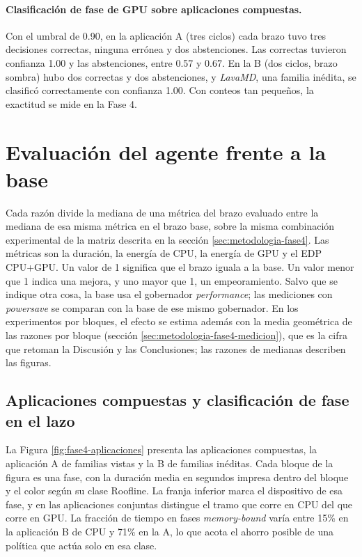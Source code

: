 \paragraph{Clasificación de fase de GPU sobre aplicaciones compuestas.}\label{sec:resultados-agente-deteccion} Con el umbral de 0.90, en la aplicación A (tres ciclos) cada brazo tuvo tres decisiones correctas, ninguna errónea y dos abstenciones. Las correctas tuvieron confianza 1.00 y las abstenciones, entre 0.57 y 0.67. En la B (dos ciclos, brazo sombra) hubo dos correctas y dos abstenciones, y \textit{LavaMD}, una familia inédita, se clasificó correctamente con confianza 1.00. Con conteos tan pequeños, la exactitud se mide en la Fase 4.



\section{Evaluación del agente frente a la base}
\label{sec:resultados-fase4}

Cada razón divide la mediana de una métrica del brazo evaluado entre la mediana de esa misma métrica en el brazo base, sobre la misma combinación experimental de la matriz descrita en la sección \ref{sec:metodologia-fase4}. Las métricas son la duración, la energía de CPU, la energía de GPU y el EDP CPU+GPU. Un valor de 1 significa que el brazo iguala a la base. Un valor menor que 1 indica una mejora, y uno mayor que 1, un empeoramiento. Salvo que se indique otra cosa, la base usa el gobernador \textit{performance}; las mediciones con \textit{powersave} se comparan con la base de ese mismo gobernador. En los experimentos por bloques, el efecto se estima además con la media geométrica de las razones por bloque (sección \ref{sec:metodologia-fase4-medicion}), que es la cifra que retoman la Discusión y las Conclusiones; las razones de medianas describen las figuras.

\subsection{Aplicaciones compuestas y clasificación de fase en el lazo}
\label{sec:resultados-fase4-apps}

La Figura \ref{fig:fase4-aplicaciones} presenta las aplicaciones compuestas, la aplicación A de familias vistas y la B de familias inéditas. Cada bloque de la figura es una fase, con la duración media en segundos impresa dentro del bloque y el color según su clase Roofline. La franja inferior marca el dispositivo de esa fase, y en las aplicaciones conjuntas distingue el tramo que corre en CPU del que corre en GPU. La fracción de tiempo en fases \textit{memory-bound} varía entre 15\% en la aplicación B de CPU y 71\% en la A, lo que acota el ahorro posible de una política que actúa solo en esa clase.

